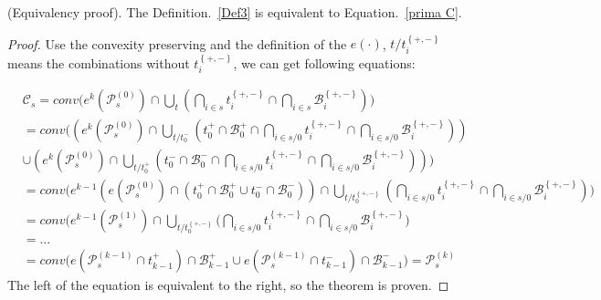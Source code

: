 \documentclass[runningheads]{llncs}
\begin{document}
\begin{theorem}
\label{theorem2}
(Equivalency proof). The Definition.~\ref{Def3} is equivalent to Equation.~\ref{prima C}.
\begin{proof}
Use the convexity preserving and the definition of the $e(\cdot)$, $t/ t_{i}^{\left\{+,- \right\}}$ means the combinations without $t_{i}^{\left\{+,- \right\}}$, we can get following equations:

\begin{equation*}
\begin{aligned}
&\mathcal{C}_{s} =  conv\big( e^{k}( \mathcal{P}_{s}^{(0)})\cap   \bigcup_{t} (\bigcap_{i \in s}^{}t_{i}^{\left\{ +,-\right\}} \cap \bigcap_{i \in s}^{}\mathcal{B}_{i}^{\left\{ +,-\right\}})\big)\\
%
&= conv\big( (e^{k}( \mathcal{P}_{s}^{(0)})\cap  \bigcup_{t/t^{-}_{0}} (t_{0}^{+} \cap \mathcal{B}_{0}^{+} \cap \bigcap_{i \in s/0}^{}t_{i}^{\left\{ +,-\right\}} \cap \bigcap_{i \in s/0}^{}\mathcal{B}_{i}^{\left\{ +,-\right\}}))\\
& \cup (e^{k}( \mathcal{P}_{s}^{(0)})\cap \bigcup_{t/t^{+}_{0}} (t_{0}^{-} \cap \mathcal{B}_{0}^{-} \cap \bigcap_{i \in s/0}^{}t_{i}^{\left\{ +,-\right\}} \cap \bigcap_{i \in s/0}^{}\mathcal{B}_{i}^{\left\{ +,-\right\}})) \big)\\
%
&= conv\big( e^{k-1}( e(\mathcal{P}_{s}^{(0)})\cap( t_{0}^{+}\cap \mathcal{B}^{+}_{0} \cup t_{0}^{-}\cap \mathcal{B}^{-}_{0}))\cap \!\!\!\!  \bigcup_{t/t_{0}^{\left\{+,- \right\}}}\!\! (\bigcap_{i \in s/0}^{}t_{i}^{\left\{ +,-\right\}} \cap\!\! \bigcap_{i \in s/0}^{}\!\! \mathcal{B}_{i}^{\left\{ +,-\right\}})\big)\\
&= conv\big(e^{k-1}(\mathcal{P}_{s}^{(1)}) \cap   \bigcup_{t/t_{0}^{\left\{ +,-\right\}}} (\bigcap_{i \in s/0}^{}t_{i}^{\left\{ +,-\right\}} \cap \bigcap_{i \in s/0}^{}\mathcal{B}_{i}^{\left\{ +,-\right\}} \big)\\
&= ...\\
&= conv\big( e(\mathcal{P}^{(k-1)}_{s} \cap t_{k-1}^{+} ) \cap \mathcal{B}_{k-1}^{+}\cup e(\mathcal{P}^{(k-1)}_{s} \cap t_{k-1}^{-} ) \cap \mathcal{B}_{k-1}^{-}\big) = \mathcal{P}_{s}^{(k)}
\end{aligned}
\end{equation*}
The left of the equation is equivalent to the right, so the theorem is proven. 
\end{proof}
\end{theorem}
%
%
%
\end{document}
